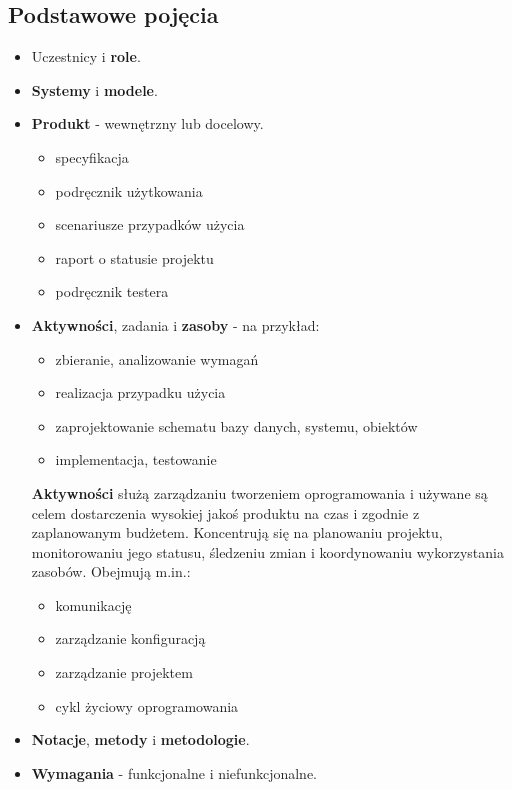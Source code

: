 \documentclass[a4paper]{article}
\begin{document}
    \subsection{Podstawowe pojęcia}
    \begin{itemize}
        \item Uczestnicy i \textbf{role}.
        \item \textbf{Systemy} i \textbf{modele}.
        \item \textbf{Produkt} - wewnętrzny lub docelowy.
        \begin{itemize}
            \item specyfikacja
            \item podręcznik użytkowania
            \item scenariusze przypadków użycia
            \item raport o statusie projektu
            \item podręcznik testera
        \end{itemize}
        \item \textbf{Aktywności}, zadania i \textbf{zasoby} - na przykład:
        \begin{itemize}
            \item zbieranie, analizowanie wymagań
            \item realizacja przypadku użycia
            \item zaprojektowanie schematu bazy danych, systemu, obiektów
            \item implementacja, testowanie
        \end{itemize}
        \textbf{Aktywności} służą zarządzaniu tworzeniem oprogramowania i używane są celem dostarczenia
        wysokiej jakoś produktu na czas i zgodnie z zaplanowanym budżetem. Koncentrują się na planowaniu
        projektu, monitorowaniu jego statusu, śledzeniu zmian i koordynowaniu wykorzystania zasobów.
        Obejmują m.in.:
        \begin{itemize}
            \item komunikację
            \item zarządzanie konfiguracją
            \item zarządzanie projektem
            \item cykl życiowy oprogramowania
        \end{itemize}
        \item \textbf{Notacje}, \textbf{metody} i \textbf{metodologie}.
        \item \textbf{Wymagania} - funkcjonalne i niefunkcjonalne.
    \end{itemize}
\end{document}
